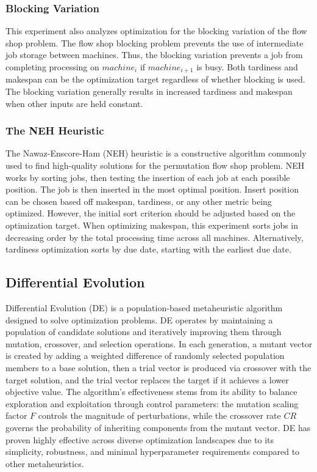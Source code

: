 \documentclass{article}
\begin{document}
\subsubsection{Blocking Variation}

This experiment also analyzes optimization for the blocking variation of the flow shop problem. The flow shop blocking problem prevents the use of intermediate job storage between machines. Thus, the blocking variation prevents a job from completing processing on $machine_i$ if $machine_{i+1}$ is busy. Both tardiness and makespan can be the optimization target regardless of whether blocking is used. The blocking variation generally results in increased tardiness and makespan when other inputs are held constant.

\subsubsection{The NEH Heuristic}

The Nawaz-Enscore-Ham (NEH) heuristic is a constructive algorithm commonly used to find high-quality solutions for the permutation flow shop problem. NEH works by sorting jobs, then testing the insertion of each job at each possible position. The job is then inserted in the most optimal position. Insert position can be chosen based off makespan, tardiness, or any other metric being optimized. However, the initial sort criterion should be adjusted based on the optimization target. When optimizing makespan, this experiment sorts jobs in decreasing order by the total processing time across all machines. Alternatively, tardiness optimization sorts by due date, starting with the earliest due date. 


\subsection{Differential Evolution}

Differential Evolution (DE) is a population-based metaheuristic algorithm designed to solve optimization problems. DE operates by maintaining a population of candidate solutions and iteratively improving them through mutation, crossover, and selection operations. In each generation, a mutant vector is created by adding a weighted difference of randomly selected population members to a base solution, then a trial vector is produced via crossover with the target solution, and the trial vector replaces the target if it achieves a lower objective value. The algorithm's effectiveness stems from its ability to balance exploration and exploitation through control parameters: the mutation scaling factor $F$ controls the magnitude of perturbations, while the crossover rate $CR$ governs the probability of inheriting components from the mutant vector. DE has proven highly effective across diverse optimization landscapes due to its simplicity, robustness, and minimal hyperparameter requirements compared to other metaheuristics.
\end{document}
